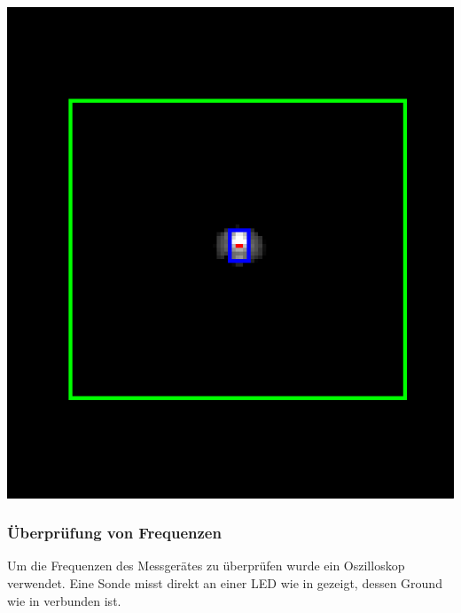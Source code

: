 \noindent\begin{minipage}[t]{.497\linewidth}\vspace{0pt}

    \includegraphics[width=\linewidth]{../images/pwm-test-areas.png}
    \vspace{-2.5em}
    \label{img:PWM-Machbarkeitsanalyse-Flächen}

\end{minipage}

\subsubsection{Überprüfung von Frequenzen}\label{sec:Überprüfung-von-Frequenzen}

Um die Frequenzen des Messgerätes zu überprüfen wurde ein Oszilloskop verwendet.
Eine Sonde misst direkt an einer LED wie in  gezeigt,
dessen Ground wie in  verbunden ist.

